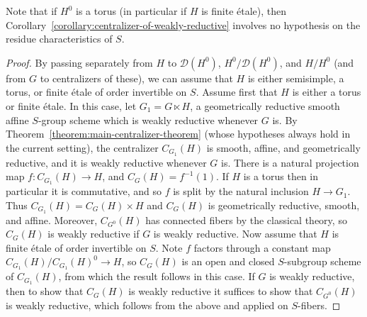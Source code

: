 \documentclass[11pt, letterpaper,english]{amsart}
\theoremstyle{plain}
\theoremstyle{definition}
\numberwithin{equation}{section}
\numberwithin{lem}{section}
\newcommand{\sD}{{\mathscr D}}
\begin{document}
Note that if $H^0$ is a torus (in particular if $H$ is finite \'{e}tale), then Corollary~\ref{corollary:centralizer-of-weakly-reductive} involves no hypothesis on the residue characteristics of $S$.

\begin{proof}
    By passing separately from $H$ to $\sD(H^0)$, $H^0/\sD(H^0)$, and $H/H^0$ (and from $G$ to centralizers of these), we can assume that $H$ is either semisimple, a torus, or finite \'etale of order invertible on $S$. Assume first that $H$ is either a torus or finite \'etale. In this case, let $G_1 = G \ltimes H$, a geometrically reductive smooth affine $S$-group scheme which is weakly reductive whenever $G$ is. By Theorem~\ref{theorem:main-centralizer-theorem} (whose hypotheses always hold in the current setting), the centralizer $C_{G_1}(H)$ is smooth, affine, and geometrically reductive, and it is weakly reductive whenever $G$ is. There is a natural projection map $f: C_{G_1}(H) \to H$, and $C_G(H) = f^{-1}(1)$. If $H$ is a torus then in particular it is commutative, and so $f$ is split by the natural inclusion $H \to G_1$.  Thus $C_{G_1}(H) = C_G(H) \times H$ and $C_G(H)$ is geometrically reductive, smooth, and affine. Moreover, $C_{G^0}(H)$ has connected fibers by the classical theory, so $C_G(H)$ is weakly reductive if $G$ is weakly reductive. Now assume that $H$ is finite \'etale of order invertible on $S$. Note $f$ factors through a constant map $C_{G_1}(H)/C_{G_1}(H)^0 \to H$, so $C_G(H)$ is an open and closed $S$-subgroup scheme of $C_{G_1}(H)$, from which the result follows in this case. If $G$ is weakly reductive, then to show that $C_G(H)$ is weakly reductive it suffices to show that $C_{G^0}(H)$ is weakly reductive, which follows from the above and \cite[Proposition VIII 5.11]{Fargues-Scholze} applied on $S$-fibers.


\end{proof}
\end{document}

